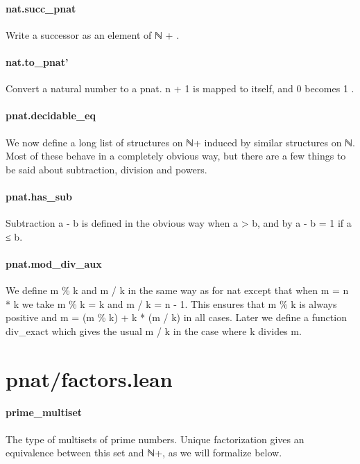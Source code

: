 \documentclass{article}
\begin{document}
\paragraph{nat.succ\_pnat}
\par
Write a successor as an element of 
\colorbox[RGB]{253,246,227}{{{{\color[RGB]{101, 123, 131} ℕ }}}{{{\color[RGB]{181, 137, 0} + }}}}.
\paragraph{nat.to\_pnat'}
\par
Convert a natural number to a pnat. 
\colorbox[RGB]{253,246,227}{{{{\color[RGB]{101, 123, 131} n }}}{{{\color[RGB]{181, 137, 0} + }}}{{{\color[RGB]{108, 113, 196} 1 }}}} is mapped to itself,
and 
\colorbox[RGB]{253,246,227}{{{{\color[RGB]{108, 113, 196} 0 }}}} becomes 
\colorbox[RGB]{253,246,227}{{{{\color[RGB]{108, 113, 196} 1 }}}}.
\paragraph{pnat.decidable\_eq}
\par
We now define a long list of structures on ℕ+ induced by
similar structures on ℕ. Most of these behave in a completely
obvious way, but there are a few things to be said about
subtraction, division and powers.
\paragraph{pnat.has\_sub}
\par
Subtraction a - b is defined in the obvious way when
a > b, and by a - b = 1 if a ≤ b.
\paragraph{pnat.mod\_div\_aux}
\par
We define m \% k and m / k in the same way as for nat
except that when m = n * k we take m \% k = k and
m / k = n - 1.  This ensures that m \% k is always positive
and m = (m \% k) + k * (m / k) in all cases.  Later we
define a function div\_exact which gives the usual m / k
in the case where k divides m.
\section{pnat/factors.lean}\paragraph{prime\_multiset}
\par
The type of multisets of prime numbers.  Unique factorization
gives an equivalence between this set and ℕ+, as we will formalize
below.
\end{document}
